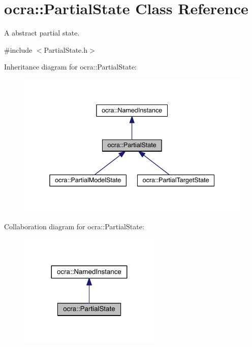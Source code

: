 \hypertarget{classocra_1_1PartialState}{}\section{ocra\+:\+:Partial\+State Class Reference}
\label{classocra_1_1PartialState}


A abstract partial state.  




{\ttfamily \#include $<$Partial\+State.\+h$>$}



Inheritance diagram for ocra\+:\+:Partial\+State\+:\nopagebreak
\begin{figure}[H]
\begin{center}
\leavevmode
\includegraphics[width=338pt]{da/d2f/classocra_1_1PartialState__inherit__graph}
\end{center}
\end{figure}


Collaboration diagram for ocra\+:\+:Partial\+State\+:\nopagebreak
\begin{figure}[H]
\begin{center}
\leavevmode
\includegraphics[width=191pt]{d3/d8e/classocra_1_1PartialState__coll__graph}
\end{center}
\end{figure}
